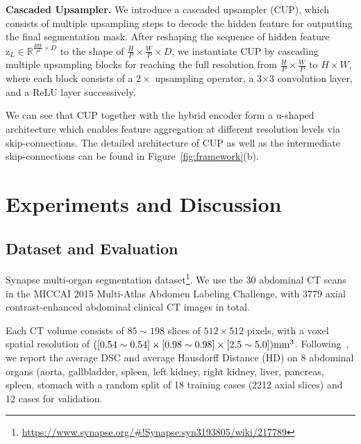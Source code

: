 \documentclass[runningheads]{llncs}
\begin{document}
\vspace{1ex}\noindent\textbf{Cascaded Upsampler.}
We introduce a cascaded upsampler (CUP), which consists of multiple upsampling steps to decode the hidden feature for outputting the final segmentation mask.
After reshaping the sequence of hidden feature $\bm{\mathrm{z}}_L \in \mathbb{R}^{\frac{HW}{P^2} \times D}$ to  the shape of $\frac{H}{P} \times \frac{W}{P} \times D$, we instantiate CUP by cascading multiple upsampling blocks for reaching the full resolution from $\frac{H}{P} \times \frac{W}{P}$  to $H \times W$, where each block consists of a $2 \times$ upsampling operator, a 3$\times$3 convolution layer, and a ReLU layer successively.

We can see that CUP together with the hybrid encoder form a u-shaped architecture which enables feature aggregation at different resolution levels via skip-connections.
The detailed architecture of CUP as well as the intermediate skip-connections can be found in Figure~\ref{fig:framework}(b).


\section{Experiments and Discussion}
\subsection{Dataset and Evaluation}
Synapse multi-organ segmentation dataset\footnote{\url{https://www.synapse.org/\#!Synapse:syn3193805/wiki/217789}}.
We use the 30 abdominal CT scans in the MICCAI 2015 Multi-Atlas Abdomen Labeling Challenge, with $3779$ axial contrast-enhanced abdominal clinical CT images in total. 

Each CT volume consists of $85\sim198$ slices of $512\times512$ pixels, with a voxel spatial resolution of $([0.54\sim0.54]\times[0.98\sim0.98]\times[2.5\sim5.0])\textup{mm}^3$. Following~\cite{fu2020domain}, we report the average DSC and average Hausdorff Distance (HD) on 8 abdominal organs (aorta, gallbladder, spleen, left kidney, right kidney, liver, pancreas, spleen, stomach with a random split of 18 training cases (2212 axial slices) and 12 cases for validation.
\end{document}
